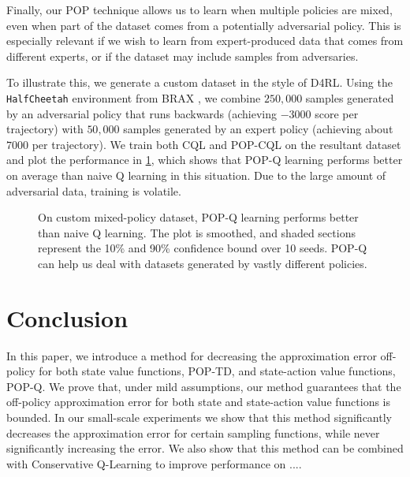 Finally, our POP technique allows us to learn when multiple policies are mixed, even when part of the dataset comes from a potentially adversarial policy. This is especially relevant if we wish to learn from expert-produced data that comes from different experts, or if the dataset may include samples from adversaries.

To illustrate this, we generate a custom dataset in the style of D4RL. Using the \texttt{HalfCheetah} environment from BRAX \citep{brax2021github}, we combine $250,000$ samples generated by an adversarial policy that runs backwards (achieving $-3000$ score per trajectory) with $50,000$ samples generated by an expert policy (achieving about $7000$ per trajectory). We train both CQL and POP-CQL on the resultant dataset and plot the performance in \cref{fig:fwdback}, which shows that POP-Q learning performs better on average than naive Q learning in this situation. Due to the large amount of adversarial data, training is volatile.

\begin{figure}[t]
  \centering
  
  \caption{
    On custom mixed-policy dataset, POP-Q learning performs better than naive Q learning. The plot is smoothed, and shaded sections represent the 10\% and 90\% confidence bound over 10 seeds. POP-Q can help us deal with datasets generated by vastly different policies.
  }
  \label{fig:fwdback}
\end{figure}

\section{Conclusion}
In this paper, we introduce a method for decreasing the approximation error off-policy for both state value functions, POP-TD, and state-action value functions, POP-Q.
We prove that, under mild assumptions, our method guarantees that the off-policy approximation error for both state and state-action value functions is bounded.
In our small-scale experiments we show that this method significantly decreases the approximation error for certain sampling functions, while never significantly increasing the error.
We also show that this method can be combined with Conservative Q-Learning to improve performance on .... %

